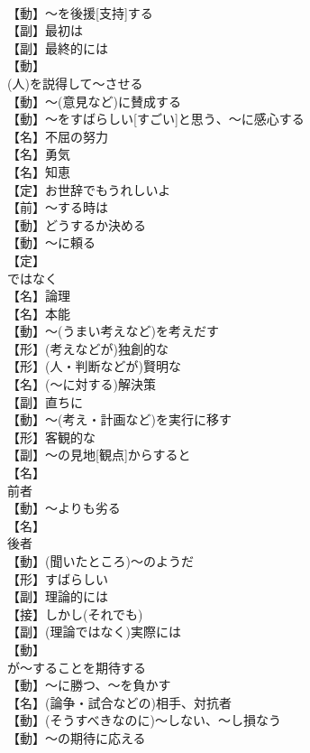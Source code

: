 \documentclass[8pt]{extreport}
\begin{document}
\begin{CJK}{UTF8}{min}
\\	【動】～を後援[支持]する
\\	【副】最初は
\\	【副】最終的には
\\	【動】
\\	(人)を説得して～させる
\\	【動】～(意見など)に賛成する
\\	【動】～をすばらしい[すごい]と思う、～に感心する
\\	【名】不屈の努力
\\	【名】勇気
\\	【名】知恵
\\	【定】お世辞でもうれしいよ
\\	【前】～する時は
\\	【動】どうするか決める
\\	【動】～に頼る
\\	【定】
\\	ではなく
\\	【名】論理
\\	【名】本能
\\	【動】～(うまい考えなど)を考えだす
\\	【形】(考えなどが)独創的な
\\	【形】(人・判断などが)賢明な
\\	【名】(～に対する)解決策
\\	【副】直ちに
\\	【動】～(考え・計画など)を実行に移す
\\	【形】客観的な
\\	【副】～の見地[観点]からすると
\\	【名】
\\	前者
\\	【動】～よりも劣る
\\	【名】
\\	後者
\\	【動】(聞いたところ)～のようだ
\\	【形】すばらしい
\\	【副】理論的には
\\	【接】しかし(それでも)
\\	【副】(理論ではなく)実際には
\\	【動】
\\	が～することを期待する
\\	【動】～に勝つ、～を負かす
\\	【名】(論争・試合などの)相手、対抗者
\\	【動】(そうすべきなのに)～しない、～し損なう
\\	【動】～の期待に応える

\end{CJK}
\end{document}
